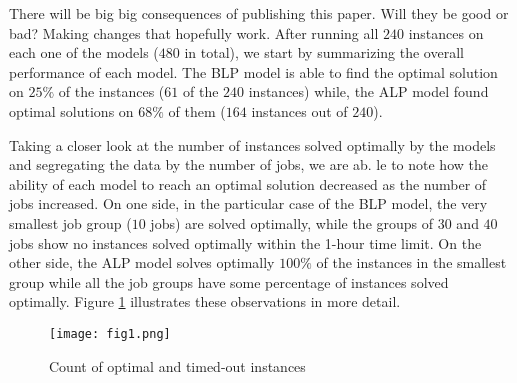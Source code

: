 There will be big big consequences of publishing this paper. Will they be good or bad?
Making changes that hopefully work.
After running all $240$ instances on each one of the models ($480$ in total), we start by summarizing the overall performance of each model. The BLP model is able to find the optimal solution on $25\%$ of the instances ($61$ of the $240$ instances) while, the ALP model found optimal solutions on $68\%$ of them ($164$ instances out of $240$).

Taking a closer look at the number of instances solved optimally by the models and segregating the data by the number of jobs, we are ab. le to note how the ability of each model to reach an optimal solution decreased as the number of jobs increased. On one side, in the particular case of the BLP model, the very smallest job group ($10$ jobs) are solved optimally, while the groups of $30$ and $40$ jobs show no instances solved optimally within the 1-hour time limit. On the other side, the ALP model solves optimally $100\%$ of the instances in the smallest group while all the job groups have some percentage of instances solved optimally. Figure \ref{fig:f1} illustrates these observations in more detail.
\begin{figure}[h!]
\caption{Count of optimal and timed-out instances}
\label{fig:f1}
\centering
\texttt{[image: fig1.png]}
\end{figure}

